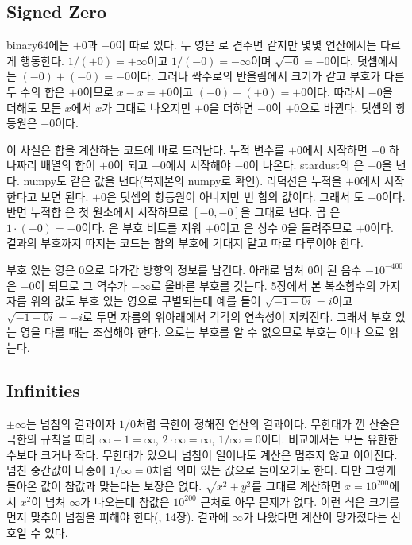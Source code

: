 \subsection{Signed Zero}

binary64에는 $+0$과 $-0$이 따로 있다. 두 영은 \code{==}로 견주면 같지만 몇몇 연산에서는 다르게 행동한다. $1/(+0)=+\infty$이고 $1/(-0)=-\infty$이며 $\sqrt{-0}=-0$이다. 덧셈에서는 $(-0)+(-0)=-0$이다. 그러나 짝수로의 반올림에서 크기가 같고 부호가 다른 두 수의 합은 $+0$이므로 $x-x=+0$이고 $(-0)+(+0)=+0$이다. 따라서 $-0$을 더해도 모든 $x$에서 $x$가 그대로 나오지만 $+0$을 더하면 $-0$이 $+0$으로 바뀐다. 덧셈의 항등원은 $-0$이다.

이 사실은 합을 계산하는 코드에 바로 드러난다. 누적 변수를 $+0$에서 시작하면 $-0$ 하나짜리 배열의 합이 $+0$이 되고 $-0$에서 시작해야 $-0$이 나온다. stardust의 은 $+0$을 낸다. numpy도 같은 값을 낸다(복제본의 numpy로 확인). 리덕션은 누적을 $+0$에서 시작한다고 보면 된다. $+0$은 덧셈의 항등원이 아니지만 빈 합의 값이다. 그래서 도 $+0$이다. 반면 누적합 은 첫 원소에서 시작하므로 $[-0,-0]$을 그대로 낸다. 곱 은 $1\cdot(-0)=-0$이다. 은 부호 비트를 지워 $+0$이고 은 상수 $0$을 돌려주므로 $+0$이다. 결과의 부호까지 따지는 코드는 합의 부호에 기대지 말고 따로 다루어야 한다.

부호 있는 영은 $0$으로 다가간 방향의 정보를 남긴다. 아래로 넘쳐 $0$이 된 음수 $-10^{-400}$은 $-0$이 되므로 그 역수가 $-\infty$로 올바른 부호를 갖는다. 5장에서 본 복소함수의 가지 자름 위의 값도 부호 있는 영으로 구별되는데 예를 들어 $\sqrt{-1+0i}=i$이고 $\sqrt{-1-0i}=-i$로 두면 자름의 위아래에서 각각의 연속성이 지켜진다\cite{kahan1987branch}. 그래서 부호 있는 영을 다룰 때는 조심해야 한다. 으로는 부호를 알 수 없으므로 부호는 이나 으로 읽는다.

\subsection{Infinities}

$\pm\infty$는 넘침의 결과이자 $1/0$처럼 극한이 정해진 연산의 결과이다. 무한대가 낀 산술은 극한의 규칙을 따라 $\infty+1=\infty$, $2\cdot\infty=\infty$, $1/\infty=0$이다. 비교에서는 모든 유한한 수보다 크거나 작다. 무한대가 있으니 넘침이 일어나도 계산은 멈추지 않고 이어진다. 넘친 중간값이 나중에 $1/\infty=0$처럼 의미 있는 값으로 돌아오기도 한다. 다만 그렇게 돌아온 값이 참값과 맞는다는 보장은 없다. $\sqrt{x^2+y^2}$를 그대로 계산하면 $x=10^{200}$에서 $x^2$이 넘쳐 $\infty$가 나오는데 참값은 $10^{200}$ 근처로 아무 문제가 없다. 이런 식은 크기를 먼저 맞추어 넘침을 피해야 한다(, 14장). 결과에 $\infty$가 나왔다면 계산이 망가졌다는 신호일 수 있다.

